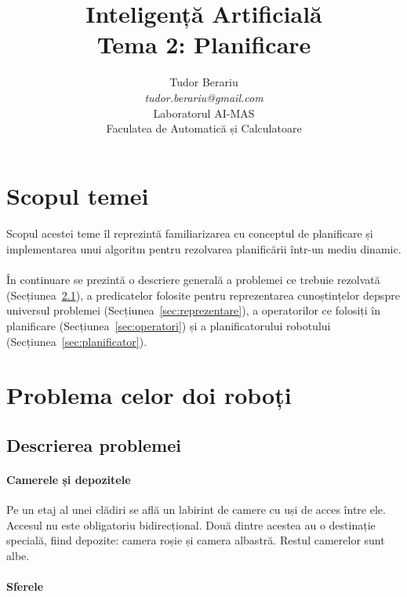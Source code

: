 \documentclass[12pt]{article}
\author{Tudor Berariu \\ \emph{tudor.berariu@gmail.com} \\ Laboratorul
  AI-MAS \\ Faculatea de Automatică și Calculatoare}
\title{Inteligență Artificială \\ Tema 2: \textbf{Planificare}}
\begin{document}
\maketitle

\section{Scopul temei}
\label{sec:scop}

\paragraph{}

Scopul acestei teme îl reprezintă familiarizarea cu conceptul de
planificare și implementarea unui algoritm pentru rezolvarea
planificării într-un mediu dinamic.

\paragraph{}

În continuare se prezintă o descriere generală a problemei ce trebuie
rezolvată (Secțiunea~\ref{sec:descriere}), a predicatelor folosite
pentru reprezentarea cunoștințelor depspre universul problemei
(Secțiunea~\ref{sec:reprezentare}), a operatorilor ce folosiți în
planificare (Secțiunea~\ref{sec:operatori}) și a planificatorului
robotului (Secțiunea~\ref{sec:planificator}).


\section{Problema celor doi roboți}
\label{sec:descriere}

\subsection{Descrierea problemei}
\label{sec:descriere}

\paragraph{Camerele și depozitele}

Pe un etaj al unei clădiri se află un labirint de camere cu uși
de acces între ele. Accesul nu este obligatoriu bidirecțional. Două
dintre acestea au o destinație specială, fiind depozite: camera roșie
și camera albastră. Restul camerelor sunt albe.

\paragraph{Sferele}
\end{document}
